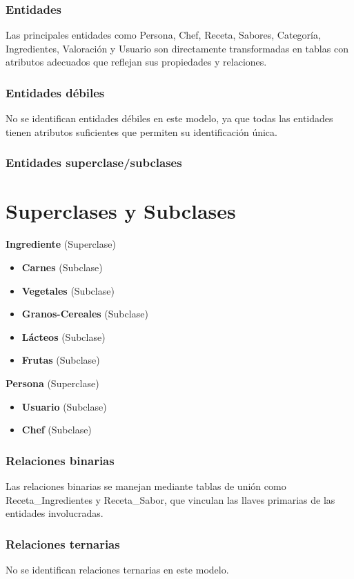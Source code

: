 \documentclass[12pt,a4paper]{article}
\begin{document}
\subsubsection{Entidades}
Las principales entidades como Persona, Chef, Receta, Sabores, Categoría, Ingredientes, Valoración y Usuario son directamente transformadas en tablas con atributos adecuados que reflejan sus propiedades y relaciones.

\subsubsection{Entidades débiles}
No se identifican entidades débiles en este modelo, ya que todas las entidades tienen atributos suficientes que permiten su identificación única.

\subsubsection{Entidades superclase/subclases}
\section*{Superclases y Subclases}

\textbf{Ingrediente} (Superclase)
\begin{itemize}
    \item \textbf{Carnes} (Subclase)
    \item \textbf{Vegetales} (Subclase)
    \item \textbf{Granos-Cereales} (Subclase)
    \item \textbf{Lácteos} (Subclase)
    \item \textbf{Frutas} (Subclase)
\end{itemize}

\textbf{Persona} (Superclase)
\begin{itemize}
    \item \textbf{Usuario} (Subclase)
    \item \textbf{Chef} (Subclase)
\end{itemize}

\subsubsection{Relaciones binarias}
Las relaciones binarias se manejan mediante tablas de unión como Receta\_Ingredientes y Receta\_Sabor, que vinculan las llaves primarias de las entidades involucradas.

\subsubsection{Relaciones ternarias}
No se identifican relaciones ternarias en este modelo.
\end{document}
